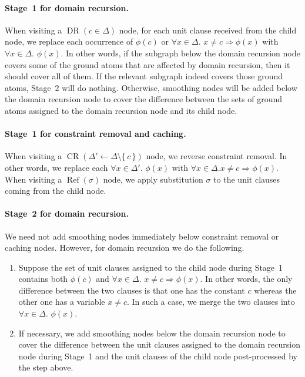 \documentclass{article}
\theoremstyle{definition}
\theoremstyle{remark}
\DeclareMathOperator{\CR}{CR}
\DeclareMathOperator{\DR}{DR}
\DeclareMathOperator{\Reff}{Ref}
\begin{document}
\paragraph{Stage~1 for domain recursion.}
When visiting a $\DR(c \in \Delta)$ node, for each unit clause received from the
child node, we replace each occurrence of $\phi(c)$ or
$\forall x \in \Delta\text{. } x \ne c \Rightarrow \phi(x)$ with
$\forall x \in \Delta\text{. }\phi(x)$. In other words, if the subgraph below
the domain recursion node covers some of the ground atoms that are affected by
domain recursion, then it should cover all of them. If the relevant subgraph
indeed covers those ground atoms, Stage~2 will do nothing. Otherwise, smoothing
nodes will be added below the domain recursion node to cover the difference
between the sets of ground atoms assigned to the domain recursion node and its
child node.

\paragraph{Stage~1 for constraint removal and caching.}
When visiting a $\CR(\Delta' \gets \Delta \setminus \{\,c\,\})$ node, we reverse
constraint removal. In other words, we replace each
$\forall x \in \Delta'\text{. }\phi(x)$ with $\forall x \in \Delta\text{.
}x \ne c \Rightarrow \phi(x)$. When visiting a $\Reff(\sigma)$ node, we apply
substitution $\sigma$ to the unit clauses coming from the child node.

\paragraph{Stage~2 for domain recursion.}
We need not add smoothing nodes immediately below constraint removal or caching
nodes. However, for domain recursion we do the following.
\begin{enumerate}
  \item Suppose the set of unit clauses assigned to the child node during
        Stage~1 contains both $\phi(c)$ and $\forall x \in \Delta\text{.
        } x \ne c \Rightarrow \phi(x)$. In other words, the only difference
        between the two clauses is that one has the constant $c$ whereas the
        other one has a variable $x \ne c$. In such a case, we merge the two
        clauses into $\forall x \in \Delta\text{. }\phi(x)$.
  \item If necessary, we add smoothing nodes below the domain recursion node to
        cover the difference between the unit clauses assigned to the domain
        recursion node during Stage~1 and the unit clauses of the child node
        post-processed by the step above.
\end{enumerate}
\end{document}
